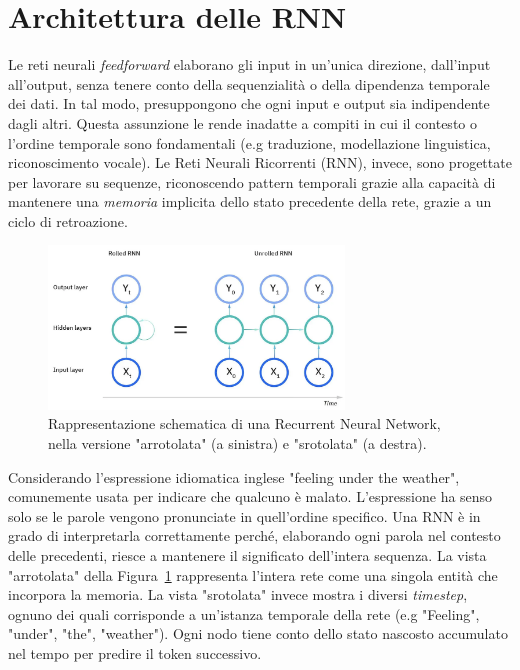 \section{Architettura delle RNN}
Le reti neurali \textit{feedforward} elaborano gli input in un'unica direzione, dall'input all'output, senza tenere conto della sequenzialità o della dipendenza temporale dei dati. In tal modo, presuppongono che ogni input e output sia indipendente dagli altri. Questa assunzione le rende inadatte a compiti in cui il contesto o l'ordine temporale sono fondamentali (e.g traduzione, modellazione linguistica, riconoscimento vocale). Le Reti Neurali Ricorrenti (RNN), invece, sono progettate per lavorare su sequenze, riconoscendo pattern temporali grazie alla capacità di mantenere una \textit{memoria} implicita dello stato precedente della rete, grazie a un ciclo di retroazione.
\begin{figure}
    \centering
    \includegraphics[width=0.70\textwidth]{figure/RNNRoll.png}
    \caption{Rappresentazione schematica di una Recurrent Neural Network, nella versione "arrotolata" (a sinistra) e "srotolata" (a destra).}
    \label{fig:rolledRNN}
\end{figure}
Considerando l'espressione idiomatica inglese "feeling under the weather", comunemente usata per indicare che qualcuno è malato. L'espressione ha senso solo se le parole vengono pronunciate in quell'ordine specifico. Una RNN è in grado di interpretarla correttamente perché, elaborando ogni parola nel contesto delle precedenti, riesce a mantenere il significato dell'intera sequenza. La vista "arrotolata" della Figura~\ref{fig:rolledRNN} rappresenta l'intera rete come una singola entità che incorpora la memoria. La vista "srotolata" invece mostra i diversi \textit{timestep}, ognuno dei quali corrisponde a un'istanza temporale della rete (e.g "Feeling", "under", "the", "weather"). Ogni nodo tiene conto dello stato nascosto accumulato nel tempo per predire il token successivo.

